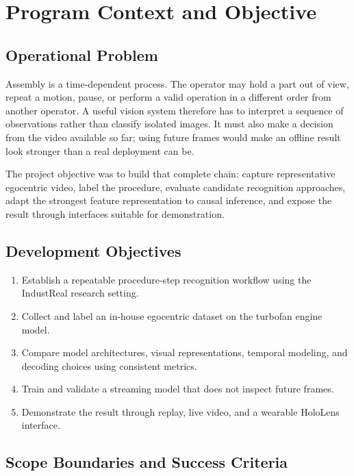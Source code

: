 \chapter{Program Context and Objective}

\section{Operational Problem}

Assembly is a time-dependent process. The operator may hold a part out of view,
repeat a motion, pause, or perform a valid operation in a different order from
another operator. A useful vision system therefore has to interpret a sequence
of observations rather than classify isolated images. It must also make a
decision from the video available so far; using future frames would make an
offline result look stronger than a real deployment can be.

The project objective was to build that complete chain: capture representative
egocentric video, label the procedure, evaluate candidate recognition approaches,
adapt the strongest feature representation to causal inference, and expose the
result through interfaces suitable for demonstration.

\section{Development Objectives}

\begin{enumerate}
    \item Establish a repeatable procedure-step recognition workflow using the
    IndustReal research setting.
    \item Collect and label an in-house egocentric dataset on the turbofan
    engine model.
    \item Compare model architectures, visual representations, temporal
    modeling, and decoding choices using consistent metrics.
    \item Train and validate a streaming model that does not inspect future
    frames.
    \item Demonstrate the result through replay, live video, and a wearable
    HoloLens interface.
\end{enumerate}

\section{Scope Boundaries and Success Criteria}

